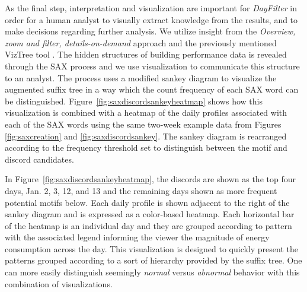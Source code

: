 As the final step, interpretation and visualization are important for \emph{DayFilter} in order for a human analyst to visually extract knowledge from the results, and to make decisions regarding further analysis. We utilize insight from the \emph{Overview, zoom and filter, details-on-demand} approach \cite{Shneiderman:1996jt} and the previously mentioned VizTree tool \cite{Lin:2004wv}. The hidden structures of building performance data is revealed through the SAX process and we use visualization to communicate this structure to an analyst. The process uses a modified sankey diagram to visualize the augmented suffix tree in a way which the count frequency of each SAX word can be distinguished.  Figure~\ref{fig:saxdiscordsankeyheatmap} shows how this visualization is combined with a heatmap of the daily profiles associated with each of the SAX words using the same two-week example data from Figures \ref{fig:saxcreation} and \ref{fig:saxdiscordsankey}. The sankey diagram is rearranged according to the frequency threshold set to distinguish between the motif and discord candidates.

In Figure~\ref{fig:saxdiscordsankeyheatmap}, the discords are shown as the top four days, Jan. 2, 3, 12, and 13 and the remaining days shown as more frequent potential motifs below. Each daily profile is shown adjacent to the right of the sankey diagram and is expressed as a color-based heatmap. Each horizontal bar of the heatmap is an individual day and they are grouped according to pattern with the associated legend informing the viewer the magnitude of energy consumption across the day. This visualization is designed to quickly present the patterns grouped according to a sort of hierarchy provided by the suffix tree. One can more easily distinguish seemingly \emph{normal} versus \emph{abnormal} behavior with this combination of visualizations. 